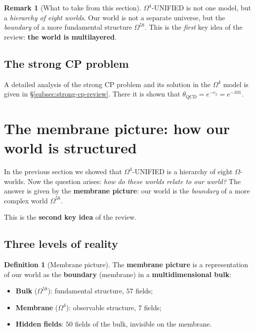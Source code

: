 \documentclass[11pt,a4paper]{article}
\newcommand{\Om}{\Omega^4}
\newcommand{\Omfi}{\Omega^{58}}
\theoremstyle{definition}
\newtheorem{definition}[theorem]{Definition}
\newtheorem{remark}[theorem]{Remark}
\begin{document}
\begin{remark}[What to take from this section]
\label{rem:worlds-takeaway}
$\Om$-UNIFIED is not one model, but a \emph{hierarchy of eight worlds}. 
Our world is not a separate universe, but the \emph{boundary} of a more 
fundamental structure $\Omfi$. This is the \emph{first} key 
idea of the review: \textbf{the world is multilayered}.
\end{remark}

\subsection{The strong CP problem}
\label{subsec:strong-cp-review-link}

A detailed analysis of the strong CP problem and its solution in the $\Om$ model
is given in §\ref{subsec:strong-cp-review}.
There it is shown that $\theta_{\text{QCD}} = e^{-c_2} = e^{-101}$.

\section{The membrane picture: how our world is structured}
\label{sec:membrane}

In the previous section we showed that $\Om$-UNIFIED is a 
hierarchy of eight $\Omega$-worlds. Now the question arises: 
\emph{how do these worlds relate to our world?} The answer is given by the 
\textbf{membrane picture}: our world is the \emph{boundary} 
of a more complex world $\Omfi$.

This is the \textbf{second key idea} of the review.

\subsection{Three levels of reality}
\label{subsec:three-levels}

\begin{definition}[Membrane picture]
\label{def:membrane-picture}
The \textbf{membrane picture} is a representation of our world 
as the \textbf{boundary} (membrane) in a \textbf{multidimensional bulk}:
\begin{itemize}
    \item \textbf{Bulk} ($\Omfi$): fundamental structure, 
          $57$ fields;
    \item \textbf{Membrane} ($\Om$): observable structure, 
          $7$ fields;
    \item \textbf{Hidden fields}: $50$ fields of the bulk, invisible 
          on the membrane.
\end{itemize}
\end{definition}
\end{document}
